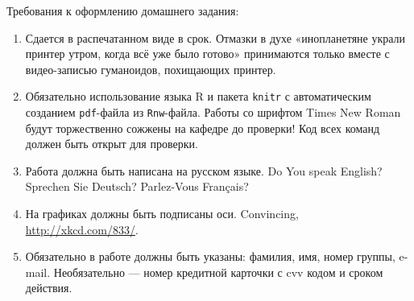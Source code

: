 \documentclass[12pt, a4paper]{article}\usepackage[]{graphicx}\usepackage[]{color}
\begin{document}
\begin{enumerate}
				\end{enumerate}

				Требования к оформлению домашнего задания:
				\vspace{0.5cm}
				\begin{enumerate}
					\item Сдается в распечатанном виде в срок. Отмазки в духе «инопланетяне украли принтер утром, когда всё уже было готово» принимаются только вместе с видео-записью гуманоидов, похищающих принтер.
					\item Обязательно использование языка R и пакета \verb|knitr| с автоматическим созданием \verb|pdf|-файла из \verb|Rnw|-файла. Работы со шрифтом Times New Roman будут торжественно сожжены на кафедре до проверки! Код всех команд должен быть открыт для проверки.
					\item Работа должна быть написана на русском языке. Do You speak English? Sprechen Sie Deutsch? Parlez-Vous Français?
					\item На графиках должны быть подписаны оси. Convincing, \url{http://xkcd.com/833/}.
					\item Обязательно в работе должны быть указаны: фамилия, имя, номер группы, e-mail. Необязательно —  номер кредитной карточки с cvv кодом и сроком действия.
				\end{enumerate}
\end{document}
